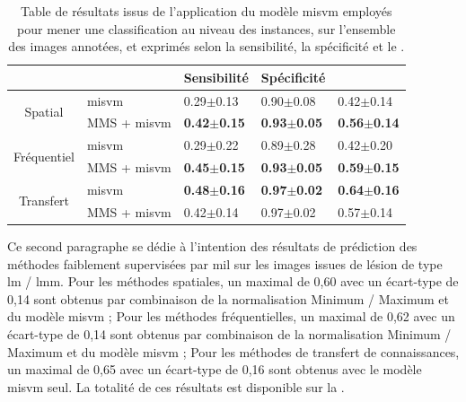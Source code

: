 \begin{table}[H]
    \centering
    \begin{tabular}{cllll}
        \toprule
        \multicolumn{1}{l}{}         &                      & Sensibilité           & Spécificité           & \fscore{}             \\ \midrule
        \multirow{2}{*}{Spatial}     & \gls{misvm}          & 0.29$\pm$0.13             & 0.90$\pm$0.08             & 0.42$\pm$0.14             \\
                                     & MMS + \gls{misvm}    & \textbf{0.42$\pm$0.15}    & \textbf{0.93$\pm$0.05}    & \textbf{0.56$\pm$0.14}    \\ \midrule
        \multirow{2}{*}{Fréquentiel} & \gls{misvm}          & 0.29$\pm$0.22             & 0.89$\pm$0.28             & 0.42$\pm$0.20             \\
                                     & MMS + \gls{misvm}    & \textbf{0.45$\pm$0.15}    & \textbf{0.93$\pm$0.05}    & \textbf{0.59$\pm$0.15}    \\ \midrule
        \multirow{2}{*}{Transfert}   & \gls{misvm}          & \textbf{0.48$\pm$0.16}    & \textbf{0.97$\pm$0.02}    & \textbf{0.64$\pm$0.16}    \\
                                     & MMS + \gls{misvm}    & 0.42$\pm$0.14             & 0.97$\pm$0.02             & 0.57$\pm$0.14             \\ \bottomrule
    \end{tabular}
    \caption{Table de résultats issus de l'application du modèle \gls{misvm} employés pour mener une classification au niveau des instances, sur l'ensemble des images annotées, et exprimés selon la sensibilité, la spécificité et le \fscore{}.}
    \label{tab:results_lesion_classification_weakly_image}
\end{table}

Ce second paragraphe se dédie à l'intention des résultats de prédiction des méthodes faiblement supervisées par \gls{mil} sur les images issues de lésion de type \gls{lm} / \gls{lmm}. Pour les méthodes spatiales, un \fscore{} maximal de 0,60 avec un écart-type de 0,14 sont obtenus par combinaison de la normalisation Minimum / Maximum et du modèle \gls{misvm} ; Pour les méthodes fréquentielles, un \fscore{} maximal de 0,62 avec un écart-type de 0,14 sont obtenus par combinaison de la normalisation Minimum / Maximum et du modèle \gls{misvm} ; Pour les méthodes de transfert de connaissances, un \fscore{} maximal de 0,65 avec un écart-type de 0,16 sont obtenus avec le modèle \gls{misvm} seul.  La totalité de ces résultats est disponible sur la .\par

